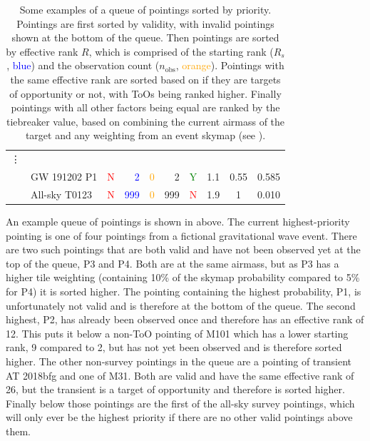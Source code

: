 \begin{colsection}
\begin{colsection}
\begin{table}[t]
\begin{center}
\begin{tabular}{c|l|c|rrr|c|ccc}
            \vdots & & & & & & \\

            &
            GW 191202 P1 &
            \textcolor{Red}{N} &
            \textcolor{Blue}{2} &
            \textcolor{Orange}{0} &
            2 &
            \textcolor{Green}{Y} &
            1.1 &
            0.55 &
            0.585 \\

            &
            All-sky T0123 &
            \textcolor{Red}{N} &
            \textcolor{Blue}{999} &
            \textcolor{Orange}{0} &
            999 &
            \textcolor{Red}{N} &
            1.9 &
            1 &
            0.010 \\

        \end{tabular}
    \end{center}
    \caption[Examples of sorting pointings by priority]{
        Some examples of a queue of pointings sorted by priority. Pointings are first sorted by validity, with invalid pointings shown at the bottom of the queue. Then pointings are sorted by effective rank $R$, which is comprised of the starting rank ($R_s$, \textcolor{Blue}{blue}) and the observation count ($n_\text{obs}$, \textcolor{Orange}{orange}). Pointings with the same effective rank are sorted based on if they are targets of opportunity or not, with ToOs being ranked higher. Finally pointings with all other factors being equal are ranked by the tiebreaker value, based on combining the current airmass of the target and any weighting from an event skymap (see ).
    }\label{tab:priority}
\end{table}

An example queue of pointings is shown in  above. The current highest-priority pointing is one of four pointings from a fictional gravitational wave event. There are two such pointings that are both valid and have not been observed yet at the top of the queue, P3 and P4. Both are at the same airmass, but as P3 has a higher tile weighting (containing 10\% of the skymap probability compared to 5\% for P4) it is sorted higher. The pointing containing the highest probability, P1, is unfortunately not valid and is therefore at the bottom of the queue. The second highest, P2, has already been observed once and therefore has an effective rank of 12. This puts it below a non-ToO pointing of M101 which has a lower starting rank, 9 compared to 2, but has not yet been observed and is therefore sorted higher. The other non-survey pointings in the queue are a pointing of transient AT 2018bfg and one of M31. Both are valid and have the same effective rank of 26, but the transient is a target of opportunity and therefore is sorted higher. Finally below those pointings are the first of the all-sky survey pointings, which will only ever be the highest priority if there are no other valid pointings above them.


\end{colsection}
\end{colsection}
